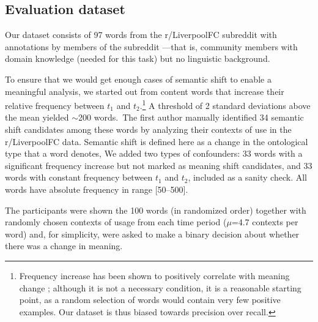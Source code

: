

\subsection{Evaluation dataset}
\label{subsec:Evaluation dataset}

Our dataset consists of 97 words from the r/LiverpoolFC subreddit with
annotations by members of the subreddit ---that is, community members
with domain knowledge (needed for this task) but no linguistic
background.

To ensure that we would get enough cases of semantic shift to enable a
meaningful analysis, we started out from content words that increase
their relative frequency between $t_1$ and $t_2$.\footnote{Frequency
  increase has been shown to positively correlate with meaning change
  \cite{wijaya2011understanding,kulkarni2015statistically}; although
  it is not a necessary condition, it is a reasonable starting point,
  as a random selection of words would contain very few positive
  examples. Our dataset is thus biased towards precision over recall.}
A threshold of 2 standard deviations above the mean yielded
$\sim$200 words.~The first author manually identified 34 semantic
shift candidates among these words by analyzing their contexts of use
in the r/LiverpoolFC data.  Semantic shift is defined here as a change
in the ontological type that a word denotes,  
We added two types of confounders: 33 words
with a significant frequency increase but not marked as meaning
shift candidates, and 33 words with constant frequency between $t_1$
and $t_2$, included as a sanity check. All words have
  absolute frequency in range [50--500].

The participants were shown the 100 words (in randomized order)
together with randomly chosen contexts of usage from each time period
($\mu$=4.7 contexts per word) and, for simplicity, were asked to make
a binary decision about whether there was a change in meaning. 

